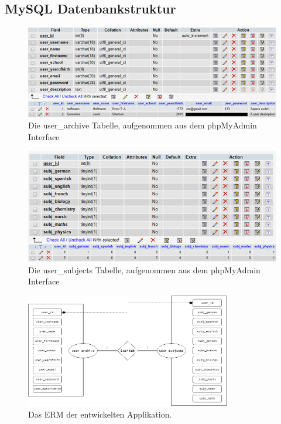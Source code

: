 \documentclass[a4paper,11pt]{report}
\begin{document}
				\subsection{MySQL Datenbankstruktur} \label{databankstructure}
				
				\begin{figure}
					\begin{center}
						\includegraphics{user_archive.png}
						\caption{Die user\_archive Tabelle, aufgenommen aus dem phpMyAdmin Interface}
						\label{user_archive:PNG}
					\end{center}
				\end{figure}
				\begin{figure}
					\begin{center}
						\includegraphics{user_subjects.png}
						\caption{Die user\_subjects Tabelle, aufgenommen aus dem phpMyAdmin Interface}
						\label{user_subjects:PNG}
					\end{center}
				\end{figure}
				\begin{figure}
					\begin{center}
						\includegraphics[width=0.8\textwidth]{ERM-Matura.png}
						\caption{Das ERM der entwickelten Applikation.}
						\label{ERM}
					\end{center}
				\end{figure}
				
\end{document}
